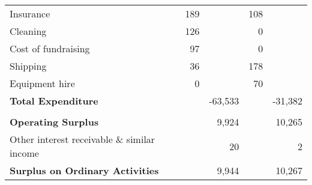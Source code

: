 \begin{center}
\begin{tabular}{ l  r  r r r }
Insurance                         & 189     &         & 108    &        \\
Cleaning                          & 126     &         & 0      &        \\
Cost of fundraising               & 97      &         & 0      &        \\
Shipping                          & 36      &         & 178    &        \\
Equipment hire                    & 0       &         & 70     &        \\
{\bf Total Expenditure}           &         & -63,533 &        & -31,382\\
\cmidrule(r){2-3} \cmidrule(r){4-5} \\
{\bf Operating Surplus}           &         & 9,924   &        & 10,265\\
Other interest receivable
\& similar income                 &         & 20      &        & 2     \\
{\bf Surplus on Ordinary Activities}&        & 9,944   &        & 10,267 \\
\bottomrule
\end{tabular}
\end{center}
\pagebreak
